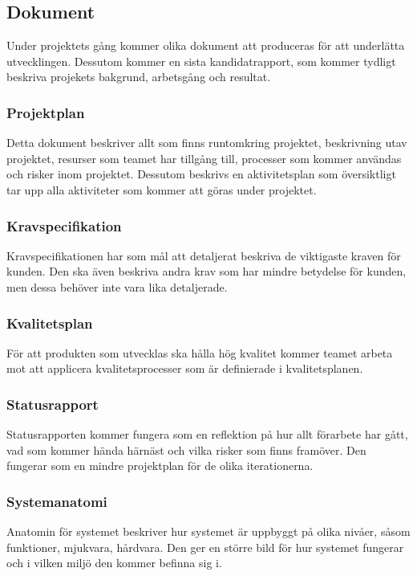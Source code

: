 \subsection{Dokument}
Under projektets gång kommer olika dokument att produceras för att underlätta utvecklingen.
Dessutom kommer en sista kandidatrapport, som kommer tydligt beskriva projekets bakgrund, arbetsgång och resultat.

\subsubsection*{Projektplan}
Detta dokument beskriver allt som finns runtomkring projektet, beskrivning utav projektet, 
resurser som teamet har tillgång till, processer som kommer användas och risker inom projektet.
Dessutom beskrivs en aktivitetsplan som översiktligt tar upp alla aktiviteter som kommer att
göras under projektet.

\subsubsection*{Kravspecifikation}
Kravspecifikationen har som mål att detaljerat beskriva de viktigaste kraven för kunden.
Den ska även beskriva andra krav som har mindre betydelse för kunden, men dessa behöver inte vara
lika detaljerade.

\subsubsection*{Kvalitetsplan}
För att produkten som utvecklas ska hålla hög kvalitet kommer teamet arbeta mot att applicera kvalitetsprocesser som är definierade i kvalitetsplanen\cite{bib-kvalitetsplan}.

\subsubsection*{Statusrapport}
Statusrapporten kommer fungera som en reflektion på hur allt förarbete har gått, vad som kommer
hända härnäst och vilka risker som finns framöver. Den fungerar som en mindre projektplan för
de olika iterationerna.

\subsubsection*{Systemanatomi}
Anatomin för systemet beskriver hur systemet är uppbyggt på olika nivåer, såsom funktioner, 
mjukvara, hårdvara. Den ger en större bild för hur systemet fungerar och i vilken miljö den kommer
befinna sig i.

